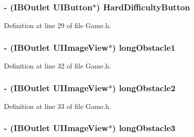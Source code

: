 \subsubsection[{Hard\+Difficulty\+Button}]{\setlength{\rightskip}{0pt plus 5cm}-\/ (I\+B\+Outlet U\+I\+Button$\ast$) Hard\+Difficulty\+Button\hspace{0.3cm}{\ttfamily [protected]}}\label{interface_game_add112e180082fe43d77188c8ce3d5218}


Definition at line 29 of file Game.\+h.

\hypertarget{interface_game_a582f50e63c4d479a078f5f62177a2ecd}{}
\subsubsection[{long\+Obstacle1}]{\setlength{\rightskip}{0pt plus 5cm}-\/ (I\+B\+Outlet U\+I\+Image\+View$\ast$) long\+Obstacle1\hspace{0.3cm}{\ttfamily [protected]}}\label{interface_game_a582f50e63c4d479a078f5f62177a2ecd}


Definition at line 32 of file Game.\+h.

\hypertarget{interface_game_a2c059f04ead15fccf161df8195e7ff19}{}
\subsubsection[{long\+Obstacle2}]{\setlength{\rightskip}{0pt plus 5cm}-\/ (I\+B\+Outlet U\+I\+Image\+View$\ast$) long\+Obstacle2\hspace{0.3cm}{\ttfamily [protected]}}\label{interface_game_a2c059f04ead15fccf161df8195e7ff19}


Definition at line 33 of file Game.\+h.

\hypertarget{interface_game_a866b9db5bc7955323e159a18bca2be12}{}
\subsubsection[{long\+Obstacle3}]{\setlength{\rightskip}{0pt plus 5cm}-\/ (I\+B\+Outlet U\+I\+Image\+View$\ast$) long\+Obstacle3\hspace{0.3cm}{\ttfamily [protected]}}\label{interface_game_a866b9db5bc7955323e159a18bca2be12}


